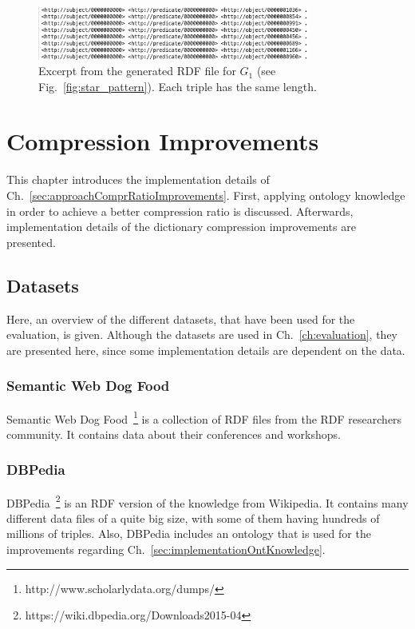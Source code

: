 \begin{figure}[h]
	\centering
	\includegraphics[width=0.8\textwidth]{figures/GRPvsHDT/file.png}
	\caption{Excerpt from the generated RDF file for $G_1$ (see Fig.~\ref{fig:star_pattern}). Each triple has the same length.}
	\label{fig:rdfFile}
\end{figure}

\section{Compression Improvements}\label{sec:implementationComprRatioImprovements}

This chapter introduces the implementation details of Ch.~\ref{sec:approachComprRatioImprovements}. First, applying ontology knowledge in order to achieve a better compression ratio is discussed. Afterwards, implementation details of the dictionary compression improvements are presented.

\subsection{Datasets}\label{sec:implementationDatasets}

Here, an overview of the different datasets, that have been used for the evaluation, is given. Although the datasets are used in Ch.~\ref{ch:evaluation}, they are presented here, since some implementation details are dependent on the data.

\subsubsection{Semantic Web Dog Food}

Semantic Web Dog Food~\footnote{http://www.scholarlydata.org/dumps/} is a collection of RDF files from the RDF researchers community. It contains data about their conferences and workshops.

\subsubsection{DBPedia}

DBPedia~\footnote{https://wiki.dbpedia.org/Downloads2015-04} is an RDF version of the knowledge from Wikipedia. It contains many different data files of a quite big size, with some of them having hundreds of millions of triples. Also, DBPedia includes an ontology that is used for the improvements regarding Ch.~\ref{sec:implementationOntKnowledge}.

